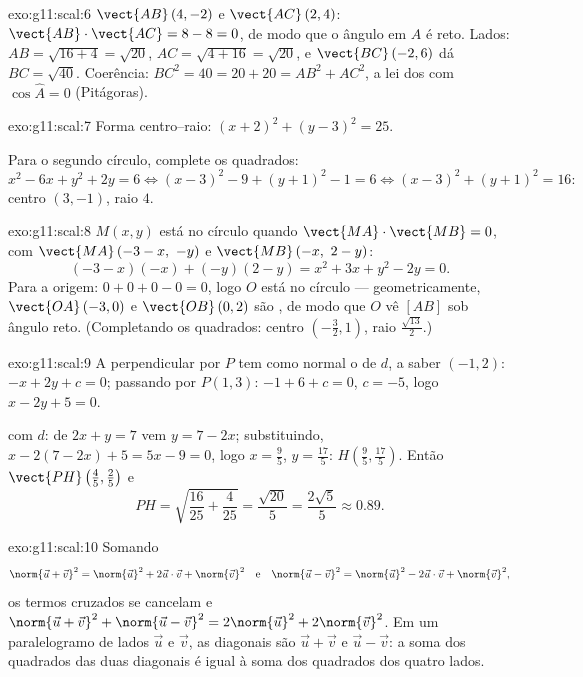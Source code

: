 \begin{solution}{exo:g11:scal:6}
$\vect{AB}\,(4, -2)$ e $\vect{AC}\,(2, 4)$:
$\vect{AB}\cdot\vect{AC} = 8 - 8 = 0$, de modo que o ângulo em $A$ é
reto. Lados: $AB = \sqrt{16 + 4} = \sqrt{20}$,
$AC = \sqrt{4 + 16} = \sqrt{20}$, e $\vect{BC}\,(-2, 6)$ dá
$BC = \sqrt{40}$. Coerência: $BC^2 = 40 = 20 + 20 = AB^2 + AC^2$, a lei
dos  com $\cos\widehat A = 0$ (Pitágoras).
\end{solution}

\begin{solution}{exo:g11:scal:7}
Forma centro--raio: $(x + 2)^2 + (y - 3)^2 = 25$.

Para o segundo círculo, complete os quadrados:
\[
x^2 - 6x + y^2 + 2y = 6
\iff (x - 3)^2 - 9 + (y + 1)^2 - 1 = 6
\iff (x-3)^2 + (y+1)^2 = 16 :
\]
centro $(3, -1)$, raio $4$.
\end{solution}

\begin{solution}{exo:g11:scal:8}
$M(x,y)$ está no círculo quando $\vect{MA}\cdot\vect{MB} = 0$, com
$\vect{MA}\,(-3 - x,\ -y)$ e $\vect{MB}\,(-x,\ 2 - y)$:
\[
(-3 - x)(-x) + (-y)(2 - y) = x^2 + 3x + y^2 - 2y = 0 .
\]
Para a origem: $0 + 0 + 0 - 0 = 0$, logo $O$ está no círculo ---
geometricamente, $\vect{OA}\,(-3,0)$ e $\vect{OB}\,(0,2)$ são
, de modo que $O$ vê $[AB]$ sob ângulo reto. (Completando os
quadrados: centro $\left(-\frac32, 1\right)$, raio
$\frac{\sqrt{13}}{2}$.)
\end{solution}

\begin{solution}{exo:g11:scal:9}
A perpendicular por $P$ tem como  normal o  de $d$, a
saber $(-1, 2)$:  $-x + 2y + c = 0$; passando por $P(1,3)$:
$-1 + 6 + c = 0$, $c = -5$, logo $x - 2y + 5 = 0$.

 com $d$: de $2x + y = 7$ vem $y = 7 - 2x$; substituindo,
$x - 2(7 - 2x) + 5 = 5x - 9 = 0$, logo $x = \frac95$, $y = \frac{17}5$:
$H\left(\frac95, \frac{17}5\right)$. Então
$\vect{PH}\left(\frac45, \frac25\right)$ e
\[
PH = \sqrt{\frac{16}{25} + \frac{4}{25}} = \frac{\sqrt{20}}{5}
= \frac{2\sqrt5}{5} \approx 0.89 .
\]
\end{solution}

\begin{solution}{exo:g11:scal:10}
Somando
\[
\norm{\vec u + \vec v}^2 = \norm{\vec u}^2 + 2\vec u\cdot\vec v +
\norm{\vec v}^2
\quad\text{e}\quad
\norm{\vec u - \vec v}^2 = \norm{\vec u}^2 - 2\vec u\cdot\vec v +
\norm{\vec v}^2,
\]
os termos cruzados se cancelam e
$\norm{\vec u + \vec v}^2 + \norm{\vec u - \vec v}^2 =
2\norm{\vec u}^2 + 2\norm{\vec v}^2$. Em um paralelogramo de lados
$\vec u$ e $\vec v$, as diagonais são $\vec u + \vec v$ e
$\vec u - \vec v$: a soma dos quadrados das duas diagonais é igual à
soma dos quadrados dos quatro lados.
\end{solution}

